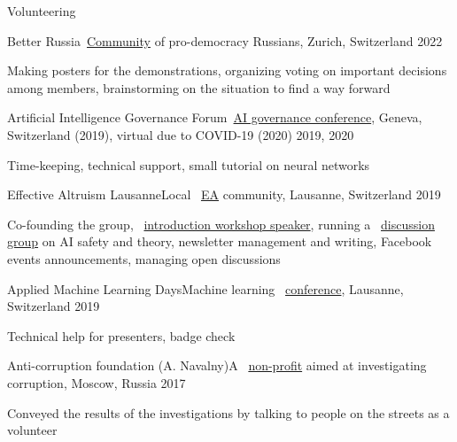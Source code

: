\documentclass{resume} %
\newcommand*{\img}[1]{%
	\raisebox{-.02\baselineskip}{%
		\texttt{[image: \#1]}%
	}%
}
\newcommand*{\emoji}[1]{\img{./emoji/\imgpref#1.png}}
\def\imgpref{bleak-}
\newcommand{\mylink}{{\color{gray}\faExternalLink}}
\begin{document}
\begin{rSection}{Volunteering}
\begin{rSubsection}{Better Russia}{}{\mylink~\href{https://betterrussia.org}{Community} of pro-democracy Russians, Zurich, Switzerland \emoji{flag-ch}}{2022}
	\item[] Making posters for the demonstrations, organizing voting on important decisions among members, brainstorming on the situation to find a way forward
\end{rSubsection}
	
\begin{rSubsection}{Artificial Intelligence Governance Forum}{}{\mylink~\href{https://ai-gf.com/}{AI governance conference}, Geneva, Switzerland (2019), virtual due to COVID-19 (2020) \emoji{flag-ch}}{2019, 2020}
	\item[] Time-keeping, technical support, small tutorial on neural networks
\end{rSubsection}
	
\begin{rSubsection}{Effective Altruism Lausanne}{}{Local \mylink~\href{https://effectivealtruism.org}{EA} community, Lausanne, Switzerland \emoji{flag-ch}}{2019}
	\item[] Co-founding the group, \mylink~\href{https://web.archive.org/web/20200128171213/https://eageneva.org/about}{introduction workshop speaker}, running a \mylink~\href{https://docs.google.com/document/d/1prejPACr08nUVztHRBc4nj4upKtDc9_EJOYi1alWuYM/edit?usp=sharing}{discussion group} on AI safety and theory, newsletter management and writing, Facebook events announcements, managing open discussions
\end{rSubsection}

\begin{rSubsection}{Applied Machine Learning Days}{}{Machine learning \mylink~\href{https://www.appliedmldays.org/}{conference}, Lausanne, Switzerland \emoji{flag-ch}}{2019}
\item[]	Technical help for presenters, badge check
\end{rSubsection}

\begin{rSubsection}{Anti-corruption foundation (A. Navalny)}{}{A \mylink~\href{https://en.wikipedia.org/wiki/Anti-Corruption_Foundation}{non-profit} aimed at investigating corruption, Moscow, Russia \emoji{flag-ru}}{2017}
\item[] Conveyed the results of the investigations by talking to people on the streets as a volunteer
\end{rSubsection}
\end{rSection}
\end{document}
